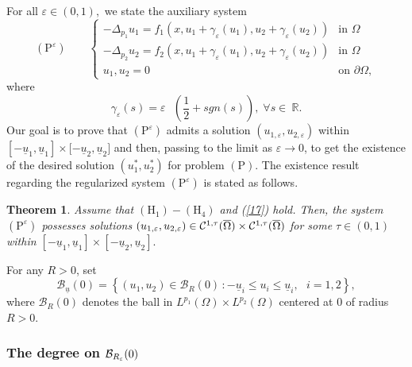 \documentclass[11pt]{amsart}
\newtheorem{theorem}{Theorem}[section]
\theoremstyle{definition}
\theoremstyle{remark}
\numberwithin{equation}{section}
\begin{document}
For all $\varepsilon \in (0,1),$ we state the auxiliary system%
\begin{equation*}
(\mathrm{P}^{\varepsilon })\qquad \left\{ 
\begin{array}{ll}
-\Delta _{p_{1}}u_{1}=f_{1}(x,u_{1}+\gamma _{\varepsilon
}(u_{1}),u_{2}+\gamma _{\varepsilon }(u_{2})) & \text{in }\Omega \\ 
-\Delta _{p_{2}}u_{2}=f_{2}(x,u_{1}+\gamma _{\varepsilon
}(u_{1}),u_{2}+\gamma _{\varepsilon }(u_{2})) & \text{in }\Omega \\ 
u_{1},u_{2}=0\text{ } & \text{on }\partial \Omega ,%
\end{array}
\right.
\end{equation*}%
where%
\begin{equation}
\gamma _{\varepsilon }(s)=\varepsilon \text{ }(\frac{1}{2}+sgn(s)),\;\forall
s\in \mathbb{\ 
\mathbb{R}
}.  \label{18}
\end{equation}%
Our goal is to prove that $(\mathrm{P}^{\varepsilon })$ admits a solution $%
(u_{1,\varepsilon },u_{2,\varepsilon })$ within $[-\underline{u}_{1},%
\underline{u}_{1}]\times \lbrack -\underline{u}_{2},\underline{u}_{2}]$ and
then, passing to the limit as $\varepsilon \rightarrow 0$, to get the
existence of the desired solution $(u_{1}^{\ast },u_{2}^{\ast })$ for
problem $(\mathrm{P})$. The existence result regarding the regularized
system $(\mathrm{P}^{\varepsilon })$ is stated as follows.

\begin{theorem}
\label{T3} Assume that $(\mathrm{H}_{1})-(\mathrm{H}_{4})$ and (\ref{17})
hold. Then, the system $(\mathrm{P}^{\varepsilon })$ possesses solutions $%
(u_{1,\varepsilon },u_{2,\varepsilon })\in \mathcal{C}^{1,\tau }(\overline{%
\Omega })\times \mathcal{C}^{1,\tau }(\overline{\Omega })$ for some $\tau
\in (0,1)$ within $\left[ -\underline{u}_{1},\underline{u}_{1}\right] \times %
\left[ -\underline{u}_{2},\underline{u}_{2}\right] .$
\end{theorem}

For any $R>0$, set%
\begin{equation*}
\mathcal{B}_{\underline{u}}(0)=\left\{ (u_{1},u_{2})\in \mathcal{B}%
_{R}(0)\,:-\underline{u}_{i}\leq u_{i}\leq \underline{u}_{i},\text{ }%
i=1,2\right\} ,
\end{equation*}%
where $\mathcal{B}_{R}(0)$ denotes the ball in $L^{p_{1}}(\Omega )\times
L^{p_{2}}(\Omega )$ centered at $0$ of radius $R>0$.

\subsubsection{\textbf{The degree on }$\mathcal{B}_{R_{\protect\varepsilon %
}}(0)$}
\end{document}

